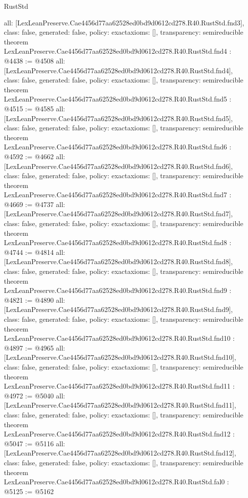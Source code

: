 \begin{lexlean}{RustStd}
\begin{coremodule}
{  all: [LexLeanPreserve.Cae4456d77aa62528ed0bd9d0612cd278.R40.RustStd.fnd3],
  class: false,
  generated: false,
  policy: exact{axioms: []},
  transparency: semireducible
}
theorem LexLeanPreserve.Cae4456d77aa62528ed0bd9d0612cd278.R40.RustStd.fnd4 : @4438 := @4508 {
  all: [LexLeanPreserve.Cae4456d77aa62528ed0bd9d0612cd278.R40.RustStd.fnd4],
  class: false,
  generated: false,
  policy: exact{axioms: []},
  transparency: semireducible
}
theorem LexLeanPreserve.Cae4456d77aa62528ed0bd9d0612cd278.R40.RustStd.fnd5 : @4515 := @4585 {
  all: [LexLeanPreserve.Cae4456d77aa62528ed0bd9d0612cd278.R40.RustStd.fnd5],
  class: false,
  generated: false,
  policy: exact{axioms: []},
  transparency: semireducible
}
theorem LexLeanPreserve.Cae4456d77aa62528ed0bd9d0612cd278.R40.RustStd.fnd6 : @4592 := @4662 {
  all: [LexLeanPreserve.Cae4456d77aa62528ed0bd9d0612cd278.R40.RustStd.fnd6],
  class: false,
  generated: false,
  policy: exact{axioms: []},
  transparency: semireducible
}
theorem LexLeanPreserve.Cae4456d77aa62528ed0bd9d0612cd278.R40.RustStd.fnd7 : @4669 := @4737 {
  all: [LexLeanPreserve.Cae4456d77aa62528ed0bd9d0612cd278.R40.RustStd.fnd7],
  class: false,
  generated: false,
  policy: exact{axioms: []},
  transparency: semireducible
}
theorem LexLeanPreserve.Cae4456d77aa62528ed0bd9d0612cd278.R40.RustStd.fnd8 : @4744 := @4814 {
  all: [LexLeanPreserve.Cae4456d77aa62528ed0bd9d0612cd278.R40.RustStd.fnd8],
  class: false,
  generated: false,
  policy: exact{axioms: []},
  transparency: semireducible
}
theorem LexLeanPreserve.Cae4456d77aa62528ed0bd9d0612cd278.R40.RustStd.fnd9 : @4821 := @4890 {
  all: [LexLeanPreserve.Cae4456d77aa62528ed0bd9d0612cd278.R40.RustStd.fnd9],
  class: false,
  generated: false,
  policy: exact{axioms: []},
  transparency: semireducible
}
theorem LexLeanPreserve.Cae4456d77aa62528ed0bd9d0612cd278.R40.RustStd.fnd10 : @4897 := @4965 {
  all: [LexLeanPreserve.Cae4456d77aa62528ed0bd9d0612cd278.R40.RustStd.fnd10],
  class: false,
  generated: false,
  policy: exact{axioms: []},
  transparency: semireducible
}
theorem LexLeanPreserve.Cae4456d77aa62528ed0bd9d0612cd278.R40.RustStd.fnd11 : @4972 := @5040 {
  all: [LexLeanPreserve.Cae4456d77aa62528ed0bd9d0612cd278.R40.RustStd.fnd11],
  class: false,
  generated: false,
  policy: exact{axioms: []},
  transparency: semireducible
}
theorem LexLeanPreserve.Cae4456d77aa62528ed0bd9d0612cd278.R40.RustStd.fnd12 : @5047 := @5116 {
  all: [LexLeanPreserve.Cae4456d77aa62528ed0bd9d0612cd278.R40.RustStd.fnd12],
  class: false,
  generated: false,
  policy: exact{axioms: []},
  transparency: semireducible
}
theorem LexLeanPreserve.Cae4456d77aa62528ed0bd9d0612cd278.R40.RustStd.fal0 : @5125 := @5162 {
}
\end{coremodule}
\end{lexlean}
